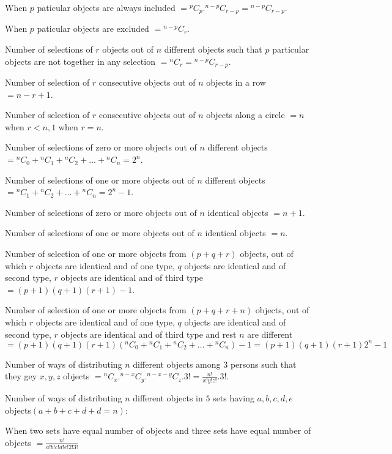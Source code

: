 \startitemize[n]
\item When $p$ paticular objects are always included $= {}^pC_p.{}^{n - p}C_{r - p} = {}^{n - p}C_{r - p}$.
\item When $p$ paticular objects are excluded $= {}^{n - p}C_r$.
\item Number of selections of $r$ objects out of $n$ different objects such that $p$ particular objects are not together in any
  selection $= {}^nC_r = {}^{n - p}C_{r - p}$.
\item Number of selection of $r$ consecutive objects out of $n$ objects in a row $= n - r + 1$.
\item Number of selection of $r$ consecutive objects out of $n$ objects along a circle $= n$ when $r < n, 1$ when $r = n$.
\item Number of selections of zero or more objects out of $n$ different objects $= {}^nC_0 + {}^nC_1 + {}^nC_2 + \ldots + {}^nC_n =
  2^n$.
\item Number of selections of one or more objects out of $n$ different objects $= {}^nC_1 + {}^nC_2 + \ldots + {}^nC_n = 2^n - 1$.
\item Number of selections of zero or more objects out of $n$ identical objects $= n + 1$.
\item Number of selections of one or more objects out of $n$ identical objects $= n$.
\item Number of selection of one or more objects from $(p + q + r)$ objects, out of which $r$ objects are identical and of one
  type, $q$ objects are identical and of second type, $r$ objects are identical and of third type $= (p + 1)(q + 1)(r + 1) - 1$.
\item Number of selection of one or more objects from $(p + q + r + n)$ objects, out of which $r$ objects are identical and of one
  type, $q$ objects are identical and of second type, $r$ objects are identical and of third type and rest $n$ are different $= (p
  + 1)(q + 1)(r + 1)({}^nC_0 + {}^nC_1 + {}^nC_2 + \ldots + {}^nC_n) - 1 = (p + 1)(q + 1)(r + 1)2^n - 1$
\item Number of ways of distributing $n$ different objects among $3$ persons such that they gey $x, y, z$ objects $= {}^nC_x.{}^{n
  - x}C_y.{}^{n - x - y}C_z.3! = \frac{n!}{x!y!z!}.3!$.
\item Number of ways of distributing $n$ different objects in $5$ sets having $a, b, c, d, e$ objects$(a + b + c + d + d = n)$:
  \startitemize[i]
  \item When two sets have equal number of objects and three sets have equal number of objects $= \frac{n!}{a!b!c!d!e!2!3!}$

